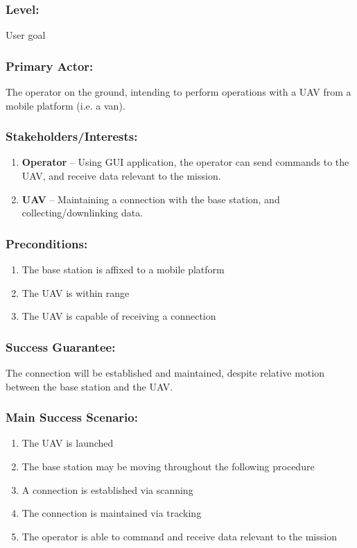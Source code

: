 \documentclass[ProductRequirements.tex]{subfiles}
\begin{document}
	\subsubsection*{Level:}
	User goal
	\subsubsection*{Primary Actor:}
	The operator on the ground, intending to perform operations with a UAV from a mobile platform (i.e. a van).
	\subsubsection*{Stakeholders/Interests:}
	\begin{enumerate}\itemsep1pt
		\item \textbf{Operator} -- Using GUI application, the operator can send commands to the UAV, and receive data relevant to the mission. 
		\item \textbf{UAV} -- Maintaining a connection with the base station, and collecting/downlinking data. 
	\end{enumerate}
	\subsubsection*{Preconditions:}
	\begin{enumerate}\itemsep1pt
		\item The base station is affixed to a mobile platform
		\item The UAV is within range
		\item The UAV is capable of receiving a connection
	\end{enumerate}
	\subsubsection*{Success Guarantee:}
	The connection will be established and maintained, despite relative motion between the base station and the UAV.
	\subsubsection*{Main Success Scenario:}
	\begin{enumerate}\itemsep1pt
		\item The UAV is launched
		\item The base station may be moving throughout the following procedure
		\item A connection is established via scanning
		\item The connection is maintained via tracking
		\item The operator is able to command and receive data relevant to the mission 
	\end{enumerate}
\end{document}
